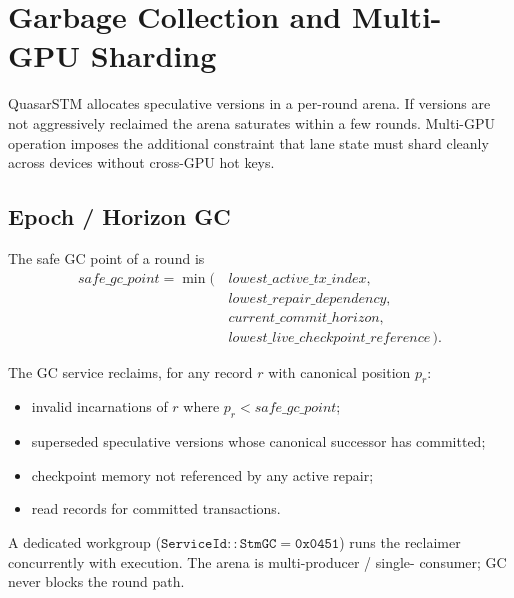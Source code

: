 \section{Garbage Collection and Multi-GPU Sharding}

\label{sec:gc}

QuasarSTM allocates speculative versions in a per-round arena. If
versions are not aggressively reclaimed the arena saturates within a
few rounds. Multi-GPU operation imposes the additional constraint
that lane state must shard cleanly across devices without cross-GPU
hot keys.

\subsection{Epoch / Horizon GC}

\begin{definition}
\label{def:safe-gc}
The safe GC point of a round is
\begin{align*}
\mathit{safe\_gc\_point} = \min\bigl(\,
& \mathit{lowest\_active\_tx\_index},\\
& \mathit{lowest\_repair\_dependency},\\
& \mathit{current\_commit\_horizon},\\
& \mathit{lowest\_live\_checkpoint\_reference}\,\bigr).
\end{align*}
\end{definition}

\begin{definition}[GC reclamation]
\label{def:gc-reclaim}
The GC service reclaims, for any record $r$ with canonical position
$p_r$:
\begin{itemize}[leftmargin=2em,nosep]
\item invalid incarnations of $r$ where $p_r < \mathit{safe\_gc\_point}$;
\item superseded speculative versions whose canonical successor
      has committed;
\item checkpoint memory not referenced by any active repair;
\item read records for committed transactions.
\end{itemize}
\end{definition}

A dedicated workgroup
($\mathtt{ServiceId::StmGC} = \mathtt{0x0451}$) runs the reclaimer
concurrently with execution. The arena is multi-producer / single-
consumer; GC never blocks the round path.

